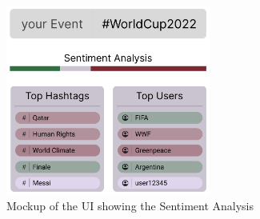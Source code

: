 \documentclass[a4paper,oneside,11pt]{scrreprt}
\begin{document}
\begin{figure}[h]
    \centering
    \caption{Mockup of the UI showing the Sentiment Analysis}
    \includegraphics[width=0.6\textwidth]{media/mockup_ui.png}
\end{figure}
\end{document}
